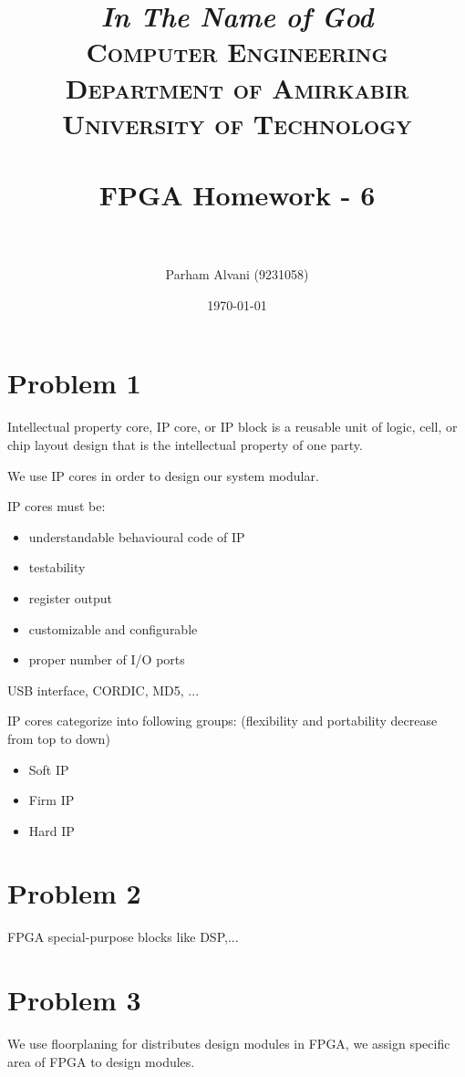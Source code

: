 \documentclass[paper=a4, fontsize=11pt]{scrartcl} %
\title{
\normalfont \normalsize
\textit{In The Name of God} \\
\textsc{Computer Engineering Department of Amirkabir University of Technology} \\ [25pt]
\horrule{0.5pt} \\[0.4cm] %
\huge FPGA Homework - 6 \\ %
\horrule{2pt} \\[0.5cm] %
}
\author{Parham Alvani (9231058)}
\date{\normalsize\today}
\numberwithin{equation}{section} %
\numberwithin{figure}{section} %
\numberwithin{table}{section} %
\begin{document}
\maketitle


\section{Problem 1}
\par Intellectual property core, IP core, or IP block is a reusable unit of
logic, cell, or chip layout design that is the intellectual property of one party.
\par We use IP cores in order to design our system modular.
\par IP cores must be:
\begin{itemize}
	\item
		understandable behavioural code of IP
	\item
		testability
	\item
		register output
	\item
		customizable and configurable
	\item
		proper number of I/O ports
\end{itemize}
\par USB interface, CORDIC, MD5, ...
\par IP cores categorize into following groups:
(flexibility and portability decrease from top to down)
\begin{itemize}
	\item
		Soft IP
	\item
		Firm IP
	\item
		Hard IP
\end{itemize}


\section{Problem 2}
\par FPGA special-purpose blocks like DSP,...


\section{Problem 3}
\par We use floorplaning for distributes design modules in FPGA, we assign
specific area of FPGA to design modules.
\end{document}
